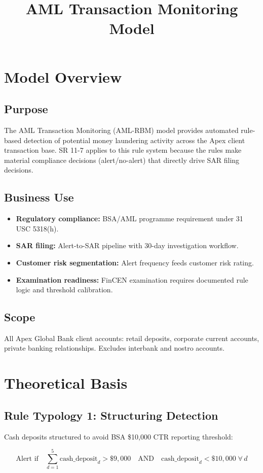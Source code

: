 \documentclass{apex_mdd}
\title{AML Transaction Monitoring Model}
\begin{document}
\maketitle
\statusbadge

\tableofcontents
\newpage

\section{Model Overview}

\subsection{Purpose}
The AML Transaction Monitoring (AML-RBM) model provides automated rule-based detection of potential money laundering activity across the Apex client transaction base. SR 11-7 applies to this rule system because the rules make material compliance decisions (alert/no-alert) that directly drive SAR filing decisions.

\subsection{Business Use}
\begin{itemize}
  \item \textbf{Regulatory compliance:} BSA/AML programme requirement under 31 USC 5318(h).
  \item \textbf{SAR filing:} Alert-to-SAR pipeline with 30-day investigation workflow.
  \item \textbf{Customer risk segmentation:} Alert frequency feeds customer risk rating.
  \item \textbf{Examination readiness:} FinCEN examination requires documented rule logic and threshold calibration.
\end{itemize}

\subsection{Scope}
All Apex Global Bank client accounts: retail deposits, corporate current accounts, private banking relationships. Excludes interbank and nostro accounts.

\section{Theoretical Basis}

\subsection{Rule Typology 1: Structuring Detection}
Cash deposits structured to avoid BSA \$10,000 CTR reporting threshold:
\begin{formulabox}
\[
  \text{Alert if}\quad \sum_{d=1}^{5} \text{cash\_deposit}_d > \$9{,}000 \quad \text{AND} \quad \text{cash\_deposit}_d < \$10{,}000 \;\forall\, d
\]
\end{formulabox}
\end{document}
